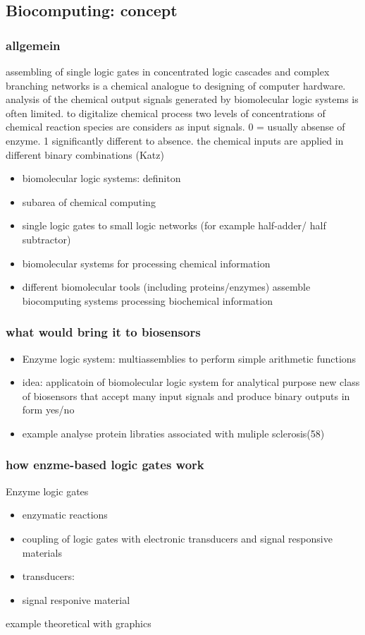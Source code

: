 \documentclass[runningheads]{llncs}
\begin{document}
\subsection{Biocomputing: concept}
	
	\subsubsection{allgemein}

	assembling of single logic gates in concentrated logic cascades and complex branching networks is a chemical analogue to designing of computer hardware. analysis of the chemical output signals generated by biomolecular logic systems is often limited.
	to digitalize chemical process two levels of concentrations of chemical reaction species are considers as input signals. 0 = usually absense of enzyme. 1 significantly different to absence. the chemical inputs are applied in different binary combinations (Katz)
		\begin{itemize}
			\item biomolecular logic systems: definiton
			\item subarea of chemical computing 
			\item single logic gates to small logic networks (for example half-adder/ half subtractor)
			\item biomolecular systems for processing chemical information
			\item different biomolecular tools (including proteins/enzymes) assemble biocomputing systems processing biochemical information \\	
		\end{itemize}
	\subsubsection{what would bring it to biosensors}	
	\begin{itemize}	
		\item Enzyme logic system: multiassemblies to perform simple arithmetic functions
		\item idea: applicatoin of biomolecular logic system for analytical purpose new class of biosensors that accept many input signals and produce binary outputs in form yes/no 
		\item example analyse protein libraties associated with muliple sclerosis(58)
	\end{itemize}

	\subsubsection{how enzme-based logic gates work}	
Enzyme logic gates
\begin{itemize}
	\item enzymatic reactions
	\item coupling of logic gates with electronic transducers and signal responsive materials
	\item transducers:
	\item signal responive material
	
\end{itemize}
example theoretical with graphics
\end{document}
